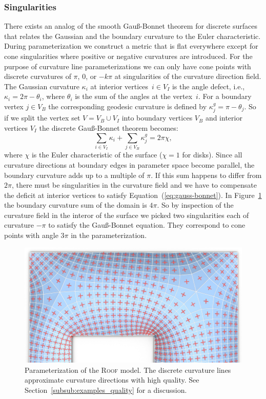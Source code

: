 \documentclass[Thesis.tex]{subfiles}
\begin{document}
\subsubsection{Singularities}
\label{subsub:singularities}
There exists an analog of the smooth Gau{\ss}-Bonnet theorem
for discrete surfaces that relates the Gaussian and the boundary curvature to
the Euler characteristic. During parameterization we construct a metric that is
flat everywhere except for cone singularities where positive or negative
curvatures are introduced. For the purpose of curvature line parameterizations
we can only have cone points with discrete curvatures of $\pi$, $0$, or $-k\pi$
at singularities of the curvature direction field. The Gaussian curvature
$\kappa_i$ at interior vertices~$i\in V_I$ is the angle defect, i.e., $\kappa_i =
2\pi-\theta_i$, where $\theta_i$ is the sum of the angles at the vertex~$i$.
For a boundary vertex $j\in V_B$ the corresponding geodesic curvature is defined by
$\kappa^g_j = \pi-\theta_j$. So if we split the vertex set $V = V_B \cup V_I$ into
boundary vertices $V_B$ and interior vertices $V_I$ the discrete
Gau{\ss}-Bonnet theorem becomes:
\begin{equation}
  \label{eq:gauss-bonnet} \sum_{i\in {V_I}}\kappa_i + \sum_{j\in
  V_B}\kappa^g_j = 2\pi \chi,
\end{equation} 
where $\chi$ is the Euler characteristic of the surface ($\chi = 1$ for disks).
Since all curvature directions at boundary edges in parameter space become parallel, the
boundary curvature adds up to a multiple of $\pi$. If this sum happens to
differ from $2\pi$, there must be singularities in the curvature field and we
have to compensate the deficit at interior vertices to satisfy
Equation~(\ref{eq:gauss-bonnet}). In Figure~\ref{fig:dach01_directions} the
boundary curvature sum of the domain is $4\pi$. So by inspection of the curvature field in the 
interor of the surface we picked two singularities each of curvature $-\pi$ to satisfy the 
Gau{\ss}-Bonnet equation. They correspond to cone points with angle $3\pi$ in the 
parameterization.

\begin{figure}[t]
\centering
\includegraphics[width=\linewidth]{image/aag2012/dach_example01_directions.png}
\caption{Parameterization of the \textsc{Roof} model. The discrete 
curvature lines approximate curvature directions with high quality. See 
Section~\ref{subsub:examples_quality} for a discussion.}
\label{fig:dach01_directions}
\end{figure}
\end{document}
